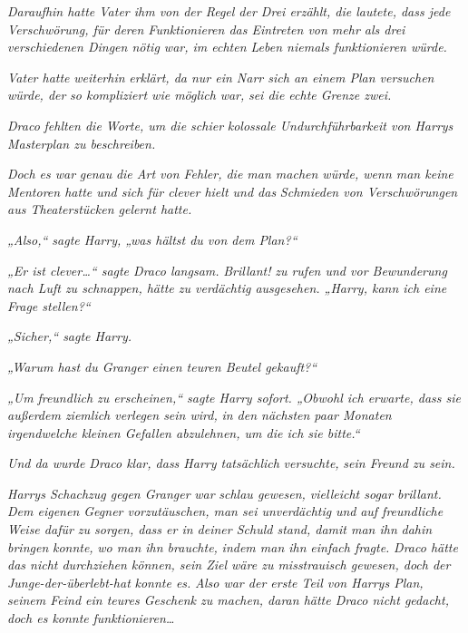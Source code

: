 {\emph{Daraufhin hatte Vater ihm von der Regel der Drei erzählt, die lautete, dass jede} \emph{Verschwörung, für deren Funktionieren das Eintreten von mehr als drei verschiedenen Dingen nötig war, im echten Leben niemals funktionieren würde.}

\emph{Vater hatte} \emph{\emph{weiterhin}} \emph{erklärt, da nur ein Narr sich an einem Plan versuchen würde, der} \emph{\emph{so kompliziert wie möglich}} \emph{war,} \emph{sei die echte Grenze zwei.}

\emph{Draco} \emph{fehlten die Worte, um die schier} \emph{kolossale Undurchführbarkeit von Harrys Masterplan zu beschreiben.}

\emph{Doch es war} \emph{\emph{genau}} \emph{die Art von Fehler, die man machen würde, wenn man keine Mentoren hatte und sich für clever hielt und das} \emph{Schmieden von Verschwörungen aus Theaterstücken gelernt hatte.}

\emph{„Also,“ sagte Harry, „was hältst du von dem Plan?“}

\emph{„Er ist clever…“ sagte Draco langsam.} \emph{\emph{Brillant!}} \emph{zu rufen und vor Bewunderung nach Luft zu schnappen, hätte zu verdächtig ausgesehen. „Harry, kann ich eine Frage stellen?“}

\emph{„Sicher,“ sagte Harry.}

\emph{„Warum hast du Granger einen teuren Beutel gekauft?“}

\emph{„Um} \emph{freundlich zu erscheinen,“ sagte Harry sofort. „Obwohl ich erwarte, dass sie außerdem ziemlich verlegen sein wird,} \emph{in den nächsten paar Monaten irgendwelche kleinen Gefallen abzulehnen, um die ich sie bitte.“}

\emph{Und da wurde Draco klar, dass Harry tatsächlich} \emph{\emph{versuchte,}} \emph{sein Freund zu sein.}

\emph{Harrys Schachzug gegen Granger} \emph{\emph{war}} \emph{schlau gewesen, vielleicht sogar brillant. Dem eigenen Gegner vorzutäuschen, man sei unverdächtig} \emph{\emph{und}} \emph{auf freundliche} \emph{Weise dafür zu sorgen, dass er in deiner Schuld stand, damit man ihn} \emph{dahin bringen} \emph{konnte,} \emph{wo man ihn brauchte,} \emph{\emph{indem man ihn}} \emph{\emph{einfach fragte.}} \emph{Draco hätte das nicht durchziehen können, sein Ziel wäre zu misstrauisch gewesen, doch der Junge-der-überlebt-hat} \emph{\emph{konnte es.}} \emph{Also war der erste Teil von Harrys Plan, seinem Feind ein teures Geschenk zu machen, daran hätte Draco nicht gedacht, doch es konnte} \emph{\emph{funktionieren…}}

}
